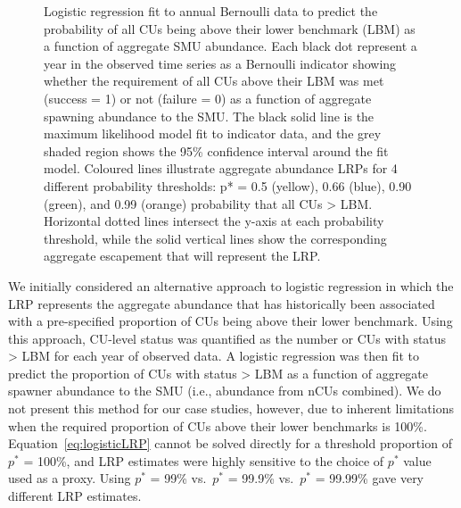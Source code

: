 \documentclass[11pt]{book}
\begin{document}
\begin{figure}[htb]

{\centering {} 

}

\caption{Logistic regression fit to annual Bernoulli data to predict the probability of all CUs being above their lower benchmark (LBM) as a function of aggregate SMU abundance. Each black dot represent a year in the observed time series as a Bernoulli indicator showing whether the requirement of all CUs above their LBM was met (success = 1) or not (failure = 0) as a function of aggregate spawning abundance to the SMU. The black solid line is the maximum likelihood model fit to indicator data, and the grey shaded region shows the 95\% confidence interval around the fit model. Coloured lines illustrate aggregate abundance LRPs for 4 different probability thresholds: p* = 0.5 (yellow), 0.66 (blue), 0.90 (green), and 0.99 (orange) probability that all CUs > LBM. Horizontal dotted lines intersect the y-axis at each probability threshold, while the solid vertical lines show the corresponding aggregate escapement that will represent the LRP.}\label{fig:example-logisticFit}
\end{figure}
We initially considered an alternative approach to logistic regression in which the LRP represents the aggregate abundance that has historically been associated with a pre-specified proportion of CUs being above their lower benchmark. Using this approach, CU-level status was quantified as the number or CUs with status \textgreater{} LBM for each year of observed data. A logistic regression was then fit to predict the proportion of CUs with status \textgreater{} LBM as a function of aggregate spawner abundance to the SMU (i.e., abundance from nCUs combined). We do not present this method for our case studies, however, due to inherent limitations when the required proportion of CUs above their lower benchmarks is 100\%. Equation~\ref{eq:logisticLRP} cannot be solved directly for a threshold proportion of \(p^*\) = 100\%, and LRP estimates were highly sensitive to the choice of \(p^*\) value used as a proxy. Using \(p^*\) = 99\% vs.~\(p^*\) = 99.9\% vs.~\(p^*\) = 99.99\% gave very different LRP estimates.
\end{document}
